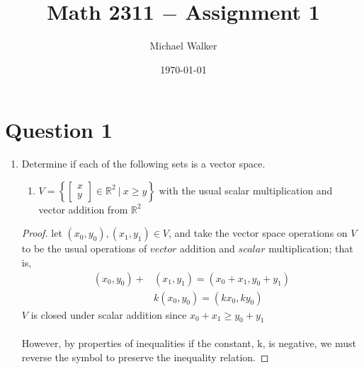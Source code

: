 \documentclass[12pt]{article}
\author{Michael Walker}
\title{Math 2311 $-$ Assignment 1}
\date{\today}
\newcommand{\DS} [1] {${\displaystyle #1}$}
\begin{document}
\maketitle
\tableofcontents
\pagebreak
\section{Question 1}
\begin{enumerate}
        \item
              Determine if each of the following sets is a vector space.
              \begin{enumerate}
                      \subsection{Answer: No, $V$ is not a vector space.}
                      \item $V=$\DS{ \left\{ \left[ \begin{array}{c}
                                                    x \\
                                                    y
                                            \end{array} \right] \in\mathbb{R}^2 \ | \ x \geq{y} \right\}}
                            with the usual scalar multiplication
                            and vector addition from $\mathbb{R}^2$
              \end{enumerate}
              \begin{proof}
                      let $({x_0}, {y_0}), ({x_1}, {y_1}) \in V$,
                      and take the vector space operations on $V$
                      to be the usual operations of $vector$
                      addition and $scalar$ multiplication; that is,
                      \begin{align}
                              ({x_0}, {y_0})+ & ({x_1}, {y_1}) =({x_0}+{x_1}, {y_0}+{y_1}) \\
                                              & k({x_0}, {y_0}) = ({kx_0}, {ky_0})
                      \end{align}
                      $V$ is closed under scalar addition since ${x_0 + x_1} \ge {y_0 + y_1}$ \\\\
                      However, by properties of inequalities if the constant,
                      k, is negative, we must reverse the symbol to preserve the inequality relation.


\end{proof}
\end{enumerate}
\end{document}
